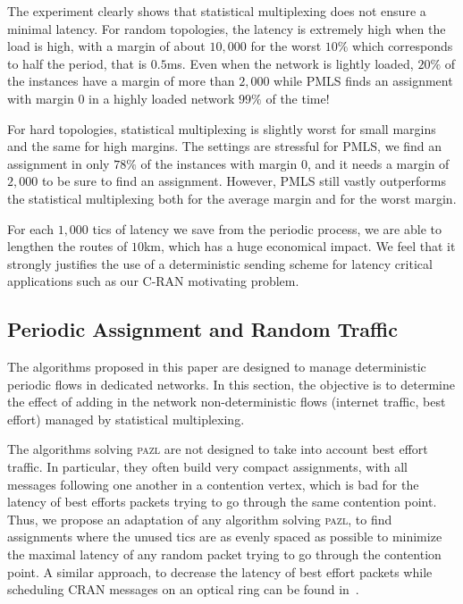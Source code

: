 \documentclass[a4paper,10pt]{article}
\newcommand\pazl{\textsc{pazl}\xspace}
\begin{document}
     
    The experiment clearly shows that statistical multiplexing does not ensure a minimal latency. 
    For random topologies, the latency is extremely high when the load is high, with a margin of about $10,000$ for the worst $10\%$ which corresponds to half the period, that is $0.5$ms. Even when the network is lightly loaded, $20\%$ of the instances have a margin of more than $2,000$ while PMLS finds an assignment with margin $0$ in a highly loaded network $99\%$ of the time! 
    
    For hard topologies, statistical multiplexing is slightly worst for small margins and  the same for high margins. The settings are stressful for PMLS, we find an assignment in only $78\%$ of the instances with margin $0$, and it needs a margin of $2,000$ to be sure to find an assignment. However, PMLS still vastly outperforms the statistical multiplexing both for the average margin and for the worst margin. 
    
    For each $1,000$ tics of latency we save from the periodic process, we are able to lengthen the routes of $10$km, which has a huge economical impact. We feel that it strongly justifies the use of a deterministic sending scheme for latency critical applications such as our C-RAN motivating problem.    
     
    \subsection{Periodic Assignment and Random Traffic}
    
    The algorithms proposed in this paper are designed to manage deterministic periodic flows in dedicated networks. In this section, the objective is to determine the effect of adding in the network non-deterministic flows (internet traffic, best effort) managed by statistical multiplexing.

    The algorithms solving \pazl are not designed to take into account best effort traffic. In particular, they often build very compact assignments, with all messages following one another in a contention vertex, which is bad for the latency of best efforts packets trying to go through the same contention point. Thus, we propose an adaptation of any algorithm solving \pazl, to find assignments where the unused tics are as evenly spaced as possible to minimize the maximal latency of any random packet trying to go through the contention point. A similar approach, to decrease the latency of best effort packets while scheduling CRAN messages on an optical ring can be found in~\cite{DBLP:conf/ondm/BarthGS19}.
    
\end{document}
